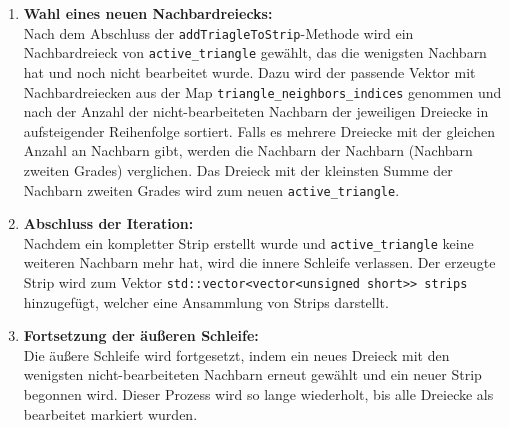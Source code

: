 \begin{enumerate}
	\item \textbf{Wahl eines neuen Nachbardreiecks:} 
	\\
	Nach dem Abschluss der \lstinline{addTriagleToStrip}-Methode wird ein Nachbardreieck von
	\lstinline{active_triangle} gewählt, das die wenigsten Nachbarn hat und noch nicht
	bearbeitet wurde. Dazu wird der passende Vektor mit Nachbardreiecken aus der
	Map \lstinline{triangle_neighbors_indices} genommen und nach der Anzahl der
	nicht-bearbeiteten Nachbarn der jeweiligen Dreiecke in aufsteigender
	Reihenfolge sortiert.
	Falls es mehrere Dreiecke mit der gleichen Anzahl an Nachbarn gibt, werden die
	Nachbarn der Nachbarn (Nachbarn zweiten Grades) verglichen. Das Dreieck mit
	der kleinsten Summe der Nachbarn zweiten Grades wird zum neuen
	\lstinline{active_triangle}. 
	\\
	\item \textbf{Abschluss der Iteration:} 
	\\
	Nachdem ein kompletter Strip erstellt wurde und \lstinline{active_triangle} keine
	weiteren Nachbarn mehr hat, wird die innere Schleife verlassen. Der erzeugte
	Strip wird zum Vektor \lstinline{std::vector<vector<unsigned short>> strips}
	hinzugefügt, welcher eine Ansammlung von Strips darstellt. 
	\\
	\item \textbf{Fortsetzung der äußeren Schleife:} 
	\\
	Die äußere Schleife wird fortgesetzt, indem ein neues Dreieck mit den
	wenigsten nicht-bearbeiteten Nachbarn erneut gewählt und ein neuer Strip
	begonnen wird. Dieser Prozess wird so lange wiederholt, bis alle Dreiecke
	als bearbeitet markiert wurden. 
	\\
\end{enumerate}
